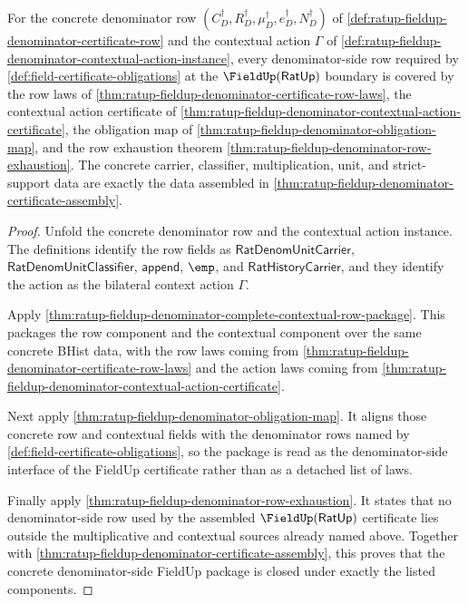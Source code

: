 \begin{theorem}
\label{thm:ratup-fieldup-denominator-package-closure}
For the concrete denominator row
$(C_D^\dagger,R_D^\dagger,\mu_D^\dagger,e_D^\dagger,N_D^\dagger)$ of
\autoref{def:ratup-fieldup-denominator-certificate-row} and the contextual
action $\Gamma$ of
\autoref{def:ratup-fieldup-denominator-contextual-action-instance}, every
denominator-side row required by \autoref{def:field-certificate-obligations} at
the $\FieldUp(\mathsf{RatUp})$ boundary is covered by the row laws of
\autoref{thm:ratup-fieldup-denominator-certificate-row-laws}, the contextual
action certificate of
\autoref{thm:ratup-fieldup-denominator-contextual-action-certificate}, the
obligation map of \autoref{thm:ratup-fieldup-denominator-obligation-map}, and
the row exhaustion theorem
\autoref{thm:ratup-fieldup-denominator-row-exhaustion}. The concrete carrier,
classifier, multiplication, unit, and strict-support data are exactly the data
assembled in \autoref{thm:ratup-fieldup-denominator-certificate-assembly}.
\end{theorem}
\begin{proof}
Unfold the concrete denominator row and the contextual action instance. The
definitions identify the row fields as
$\mathsf{RatDenomUnitCarrier}$, $\mathsf{RatDenomUnitClassifier}$,
$\mathsf{append}$, $\emp$, and $\mathsf{RatHistoryCarrier}$, and they identify
the action as the bilateral context action $\Gamma$.

Apply
\autoref{thm:ratup-fieldup-denominator-complete-contextual-row-package}. This
packages the row component and the contextual component over the same concrete
BHist data, with the row laws coming from
\autoref{thm:ratup-fieldup-denominator-certificate-row-laws} and the action laws
coming from
\autoref{thm:ratup-fieldup-denominator-contextual-action-certificate}.

Next apply \autoref{thm:ratup-fieldup-denominator-obligation-map}. It aligns
those concrete row and contextual fields with the denominator rows named by
\autoref{def:field-certificate-obligations}, so the package is read as the
denominator-side interface of the FieldUp certificate rather than as a detached
list of laws.

Finally apply \autoref{thm:ratup-fieldup-denominator-row-exhaustion}. It states
that no denominator-side row used by the assembled
$\FieldUp(\mathsf{RatUp})$ certificate lies outside the multiplicative and
contextual sources already named above. Together with
\autoref{thm:ratup-fieldup-denominator-certificate-assembly}, this proves that
the concrete denominator-side FieldUp package is closed under exactly the listed
components.
\end{proof}

